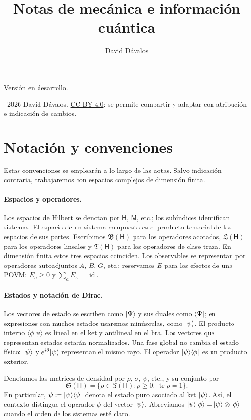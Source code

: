 \documentclass[letterpaper,12pt]{article}
\title{Notas de mecánica e información cuántica}
\author{David Dávalos}
\date{}
\DeclareMathOperator{\tr}{tr}
\DeclareMathOperator{\id}{id}
\numberwithin{equation}{section}
\begin{document}
\maketitle
\begin{center}
\small Versión en desarrollo.\par
\textcopyright\ 2026 David Dávalos.
\href{https://creativecommons.org/licenses/by/4.0/deed.es}{CC BY 4.0}:
se permite compartir y adaptar con atribución e indicación de cambios.
\end{center}

\section*{Notación y convenciones}
Estas convenciones se emplearán a lo largo de las notas. Salvo indicación
contraria, trabajaremos con espacios complejos de dimensión finita.

\paragraph{Espacios y operadores.}
Los espacios de Hilbert se denotan por $\mathsf H$, $\mathsf M$, etc.; los
subíndices identifican sistemas. El espacio de un sistema compuesto es el
producto tensorial de los espacios de sus partes.
Escribimos $\mathfrak{B}(\mathsf H)$ para los operadores acotados,
$\mathfrak{L}(\mathsf H)$ para los operadores lineales y
$\mathfrak{T}(\mathsf H)$ para los operadores de clase traza. En dimensión
finita estos tres espacios coinciden. Los observables se representan por
operadores autoadjuntos $A$, $B$, $G$, etc.; reservamos $E$ para los efectos
de una POVM: $E_a\geq0$ y $\sum_a E_a=\id$.

\paragraph{Estados y notación de Dirac.}
Los vectores de estado se escriben como ${\vert \Psi \rangle}$ y sus duales como
${\langle \Psi \vert}$; en expresiones con muchos estados usaremos minúsculas,
como ${\vert \psi \rangle}$. El producto interno $\langle\phi|\psi\rangle$ es
lineal en el ket y antilineal en el bra. Los vectores que representan
estados estarán normalizados. Una fase global no cambia el estado físico:
${\vert \psi \rangle}$ y $e^{i\theta}{\vert \psi \rangle}$ representan el mismo rayo.
El operador ${\vert \psi \rangle \langle \phi \vert}$ es un producto exterior.

Denotamos las matrices de densidad por $\rho$, $\sigma$, $\psi$, etc., y
su conjunto por
\[
  \mathfrak{S}(\mathsf H)
  =\{\rho\in\mathfrak{T}(\mathsf H):\rho\geq0,\ \tr\rho=1\}.
\]
En particular, $\psi:={\vert \psi \rangle \langle \psi \vert}$ denota el estado puro asociado
al ket ${\vert \psi \rangle}$. Así, el contexto distingue el operador $\psi$ del
vector ${\vert \psi \rangle}$. Abreviamos
${\vert \psi \rangle}{\vert \phi \rangle}={\vert \psi \rangle}\otimes{\vert \phi \rangle}$ cuando el orden
de los sistemas esté claro.
\end{document}
